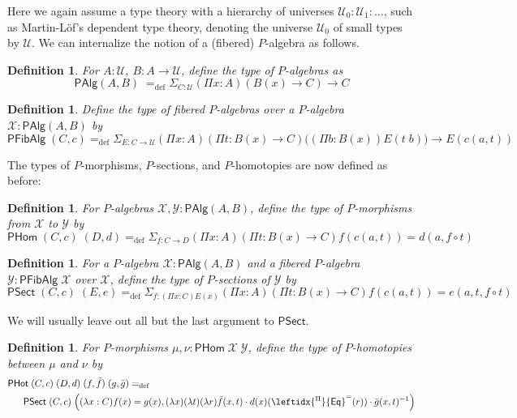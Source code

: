 \documentclass[10pt,a4paper,oneside,reqno]{amsart}
\numberwithin{equation}{section}
\theoremstyle{mythm}
\theoremstyle{mydef}
\newtheorem{definition}[theorem]{Definition}
\theoremstyle{myrmk}
\newcommand{\defeq}{=_{\mathrm{def}}}
\newcommand{\ct}{\cdot}
\newcommand{\U}{\mathcal{U}}
\newcommand{\funext}{\leftidx{^\Pi}{\mathsf{Eq}}^{=}}
\newcommand{\sm}[1]{\Sigma_{#1}}
\newcommand{\WCell}{\mathsf{PHot}}
\newcommand{\WAlg}{\mathsf{PAlg}}
\newcommand{\WFibAlg}{\mathsf{PFibAlg}}
\newcommand{\WHom}{\mathsf{PHom}}
\newcommand{\WFibHom}{\mathsf{PSect}}
\newcommand{\X}{\mathcal{X}}
\newcommand{\Y}{\mathcal{Y}}
\begin{document}
Here we again assume a type theory with a hierarchy of universes $\U_0 : \U_1 : \ldots$, such as Martin-L{\"o}f's dependent type theory, denoting the universe $\U_0$ of small types by $\U$. We can internalize the notion of a (fibered) $P$-algebra as follows.

\begin{definition}\label{def:WAlg}
For $A:\U$, $B : A \to \U$, define the type of \emph{$P$-algebras} as
\[\WAlg(A,B) \; \defeq \sm{C : \U} (\Pi x:A) (B(x) \to C) \to C \]
\end{definition}

\begin{definition}\label{def:WFibAlg}
Define the type of \emph{fibered $P$-algebras} over a $P$-algebra $\X : \WAlg(A,B)$ by
\[\WFibAlg \; (C,c) \defeq \sm{E : C \to \U} (\Pi x:A) (\Pi t: B(x) \to C) \big((\Pi b:B(x)) E(t \;b) \big) \to E(c(a,t)) \]
\end{definition}

\noindent The types of $P$-morphisms, $P$-sections, and $P$-homotopies are now defined as before:

\begin{definition}\label{def:WHom}
For $P$-algebras $\X,\Y : \WAlg(A,B)$, define the type of \emph{$P$-morphisms} from $\X$ to $\Y$ by
\[ \WHom \; (C,c) \; (D,d) \defeq \sm{f:C\to D} (\Pi x:A) (\Pi t: B(x) \to C) f(c(a,t)) = d(a,f \circ t) \]
\end{definition}

\begin{definition}\label{def:WFibHom}
For a $P$-algebra $\X : \WAlg(A,B)$ and a fibered $P$-algebra $\Y : \WFibAlg \; \X$ over $\X$, define the type of \emph{$P$-sections} of $\Y$ by
\[ \WFibHom \; (C,c) \; (E,e) \defeq \sm{f:(\Pi x:C)E(x)}(\Pi x:A) (\Pi t: B(x) \to C) f(c(a,t)) = e(a,t,f \circ t) \]
\end{definition}
We will usually leave out all but the last argument to $\WFibHom$.

\begin{definition}\label{def:WCell}
For $P$-morphisms $\mu, \nu : \WHom \; \X \; \Y$, define the type of \emph{$P$-homotopies} between $\mu$ and $\nu$ by
\begin{align*} 
& \WCell \; (C,c) \; (D,d) \; (f,\bar{f}) \; (g,\bar{g}) \defeq \\ & \;\;\; \;\;\;\WFibHom \; (C,c) \; \Big((\lambda x:C) f(x) = g(x), (\lambda x) (\lambda t) (\lambda r) \bar{f}(x,t) \ct d(x)(\funext(r)) \ct \bar{g}(x,t)^{-1}\Big)
\end{align*}
\end{definition}
\end{document}
